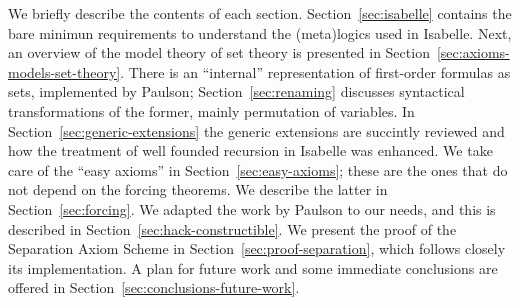 We briefly describe the contents of each
section. Section~\ref{sec:isabelle} contains the bare minimun
requirements to understand the (meta)logics used in Isabelle. Next, an
overview of the model theory of set theory is presented in
Section~\ref{sec:axioms-models-set-theory}. There is an ``internal''
representation of first-order formulas as sets, implemented by
Paulson; Section~\ref{sec:renaming} discusses syntactical
transformations of the former, mainly permutation of variables. 
In Section~\ref{sec:generic-extensions} the generic extensions are
succintly reviewed and how the treatment of well founded recursion in
Isabelle was enhanced. We take care of the ``easy axioms'' in
Section~\ref{sec:easy-axioms}; these are the ones that
do not depend on the forcing theorems. We describe the latter in
Section~\ref{sec:forcing}. We adapted the  work by Paulson to our
needs, and this is described in
Section~\ref{sec:hack-constructible}. We present the proof
of the Separation Axiom Scheme in Section~\ref{sec:proof-separation},
which follows closely its implementation. A plan for future work and
some immediate conclusions are offered in
Section~\ref{sec:conclusions-future-work}.

